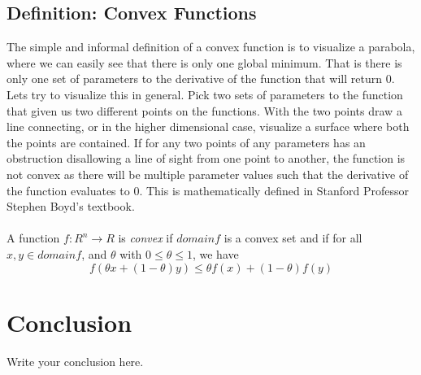 \documentclass{article}
\begin{document}
\subsection{Definition: Convex Functions}
The simple and informal definition of a convex function is to visualize a parabola, where we can easily see that there is only one global minimum. That is there is only one set of parameters to the derivative of the function that will return 0. Lets try to visualize this in general. Pick two sets of parameters to the function that given us two different points on the functions. With the two points draw a line connecting, or in the higher dimensional case, visualize a surface where both the points are contained. If for any two points of any parameters has an obstruction disallowing a line of sight from one point to another, the function is not convex as there will be multiple parameter values such that the derivative of the function evaluates to 0. This is mathematically defined in Stanford Professor Stephen Boyd's textbook.
\\
\\
A function $f:R^n \rightarrow R$ is \textit{convex} if $domain f$ is a convex set and if for all $x,y \in domain f$, and $\theta$ with $0 \leq \theta \leq 1$, we have
\begin{equation}
    \label{simple_equation}
    f(\theta x + (1 - \theta)y) \leq \theta f(x) + (1 - \theta)f(y)
\end{equation}



\section{Conclusion}
Write your conclusion here.
\end{document}
